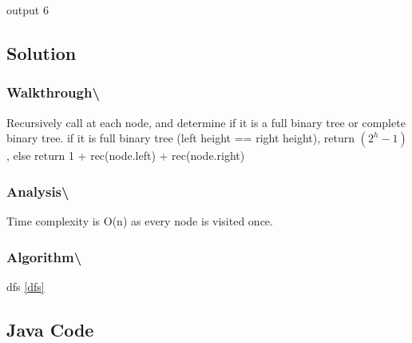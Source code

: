 \documentclass[]{book}
\begin{document}
output 6

\hypertarget{solution-39}{%
\subsection{Solution}\label{solution-39}}

\hypertarget{walkthrough-61}{%
\subsubsection{Walkthrough\textbackslash{}}\label{walkthrough-61}}

Recursively call at each node, and determine if it is a full binary tree or complete binary tree. if it is full
binary tree (left height == right height), return \((2^{h} - 1)\), else return 1 + rec(node.left) + rec(node.right)

\hypertarget{analysis-68}{%
\subsubsection{Analysis\textbackslash{}}\label{analysis-68}}

Time complexity is O(n) as every node is visited once.

\hypertarget{algorithm-70}{%
\subsubsection{Algorithm\textbackslash{}}\label{algorithm-70}}

dfs \ref{dfs}

\hypertarget{java-code-43}{%
\subsection{Java Code}\label{java-code-43}}
\end{document}

